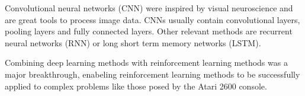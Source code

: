 Convolutional neural networks (CNN) were inspired by visual neuroscience and are great tools to process image data. CNNs usually contain convolutional layers, pooling layers and fully connected layers. Other relevant methods are recurrent neural networks (RNN) or long short term memory networks (LSTM).

Combining deep learning methods with reinforcement learning methods was a major breakthrough, enabeling reinforcement learning methods to be successfully applied to complex problems like those posed by the Atari 2600 console. \citep{deeprlLi}
\pagebreak